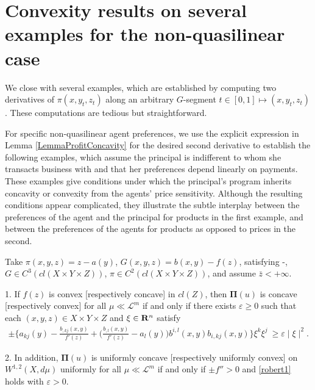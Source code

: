 \section{Convexity results on several examples for the non-quasilinear case}\label{section:example_convexity}



We  close with several examples,  which are established by computing two derivatives
of $\pi(x,y_t,z_t)$ along an arbitrary $G$-segment $t\in [0,1] \longmapsto (x,y_t,z_t)$.
These computations are tedious but straightforward.\medskip

For specific non-quasilinear agent preferences,  we use the explicit expression in Lemma \ref{LemmaProfitConcavity} for the 
desired second derivative to establish the following examples,  which assume the principal is indifferent to
whom she transacts business with and that her preferences depend linearly on payments.  
These examples give conditions under which the principal's program inherits concavity or convexity 
from the agents' price sensitivity.
Although the resulting conditions appear complicated,  they illustrate
the subtle interplay between the preferences of the agent and the principal for products in the first example,
and between the preferences of the agents for products as opposed to prices in the second. \medskip



\begin{example}
	\label{general example1}
	Take $\pi(x, y, z) =z- a(y)$, $G(x, y, z) = b(x,y)-f(z)$, satisfying \Gzero-\Gsix,  $G \in C^3(cl(X\times Y \times Z)
	)$, $\pi \in C^2(cl(X\times Y \times Z)
	)$, and assume $\bar{z}<+\infty$.
	
	1. If $f(z)$ is convex [respectively concave] in $cl(Z)$, then $\pmb \Pi(u)$ is concave [respectively convex] for all $\mu\ll \mathcal{L}^m$ if and only if there exists $\varepsilon \ge 0$ such that each $(x,y,z) \in X \times Y\times Z$ and $\xi \in {\mathbf R}^{n}$ satisfy 
	\begin{equation}\label{robert1}
	\begin{split}
	\pm \Bigg\{a_{kj}(y)-\frac{b_{,kj}(x,y)}{f'(z)}+\Big(\frac{b_{,l}(x,y)}{f'(z)}- a_l(y)\Big)b^{i,l}(x,y) b_{i,kj}(x,y)\Bigg\} \xi^{k}\xi^{j} \
	\ge  \varepsilon \mid \xi\mid ^2.
	\end{split}
	\end{equation}
	
	2. In addition, $\pmb \Pi(u)$ is uniformly concave [respectively uniformly convex] on $W^{1,2}(X,d\mu)$  uniformly for all $\mu\ll \mathcal{L}^m$ if and only if $\pm f''> 0$ and  \eqref{robert1} holds with $\varepsilon >0$.
\end{example}

